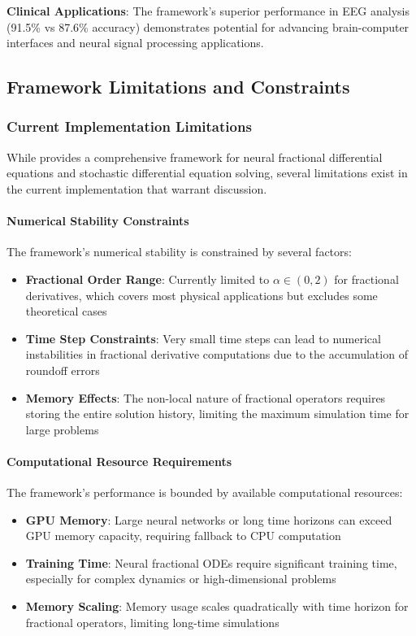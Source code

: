 \textbf{Clinical Applications}: The framework's superior performance in EEG analysis (91.5\% vs 87.6\% accuracy) demonstrates potential for advancing brain-computer interfaces and neural signal processing applications.

\subsection{Framework Limitations and Constraints}

\subsubsection{Current Implementation Limitations}

While \hpfracc provides a comprehensive framework for neural fractional differential equations and stochastic differential equation solving, several limitations exist in the current implementation that warrant discussion.

\paragraph{Numerical Stability Constraints}
The framework's numerical stability is constrained by several factors:

\begin{itemize}
    \item \textbf{Fractional Order Range}: Currently limited to $\alpha \in (0, 2)$ for fractional derivatives, which covers most physical applications but excludes some theoretical cases
    \item \textbf{Time Step Constraints}: Very small time steps can lead to numerical instabilities in fractional derivative computations due to the accumulation of roundoff errors
    \item \textbf{Memory Effects}: The non-local nature of fractional operators requires storing the entire solution history, limiting the maximum simulation time for large problems
\end{itemize}

\paragraph{Computational Resource Requirements}
The framework's performance is bounded by available computational resources:

\begin{itemize}
    \item \textbf{GPU Memory}: Large neural networks or long time horizons can exceed GPU memory capacity, requiring fallback to CPU computation
    \item \textbf{Training Time}: Neural fractional ODEs require significant training time, especially for complex dynamics or high-dimensional problems
    \item \textbf{Memory Scaling}: Memory usage scales quadratically with time horizon for fractional operators, limiting long-time simulations
\end{itemize}

